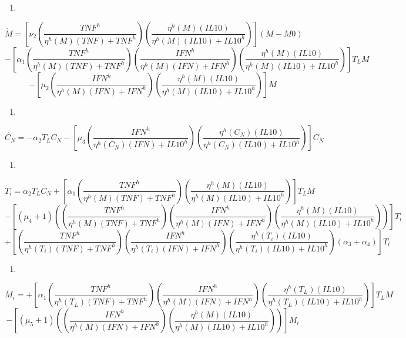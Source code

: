\documentclass[
]{article}
\providecommand{\tightlist}{%
  \setlength{\itemsep}{0pt}\setlength{\parskip}{0pt}}
\begin{document}
\begin{enumerate}
\def\labelenumi{\arabic{enumi}.}
\setcounter{enumi}{1}
\tightlist
\item
\end{enumerate}

\[ \dot{M}= [\nu_{2}(\dfrac{TNF^{h}}{\eta^{h}(M)(TNF)+TNF^{h}})(\dfrac{\eta^{h}(M)(IL10)}{\eta^{h}(M)(IL10)+IL10^{h}})](M-M0)\]
\[-[\alpha_{1}(\dfrac{TNF^{h}}{\eta^{h}(M)(TNF)+ TNF^{h}})(\dfrac{IFN^{h}}{\eta^{h}(M)(IFN)+IFN^{h}})(\dfrac{\eta^{h}(M)(IL10)}{\eta^{h}(M)(IL10)+IL10^{h}})]T_{L}M\]
\[-[\mu_{2}(\dfrac{IFN^{h}}{\eta^{h}(M)(IFN)+IFN^{h}})(\dfrac{\eta^{h}(M)(IL10)}{\eta^{h}(M)(IL10)+IL10^{h}})]M  \]

\begin{enumerate}
\def\labelenumi{\arabic{enumi}.}
\setcounter{enumi}{2}
\tightlist
\item
\end{enumerate}

\[ \dot{C_{N}}= -\alpha_{2}T_{L}C_{N}-[\mu_{3}(\dfrac{IFN^{h}}{\eta^{h}(C_{N})(IFN)+IL10^{h}})(\dfrac{\eta^{h}(C_{N})(IL10)}{\eta^{h}(C_{N})(IL10)+IL10^{h}})]C_{N} \]

\begin{enumerate}
\def\labelenumi{\arabic{enumi}.}
\setcounter{enumi}{3}
\tightlist
\item
\end{enumerate}

\[ \dot{T_{i}}=\alpha_{2}T_{L}C_{N}+[\alpha_{1}(\dfrac{TNF^{h}}{\eta^{h}(M)(TNF)+ TNF^{h}})(\dfrac{\eta^{h}(M)(IL10)}{\eta^{h}(M)(IL10)+IL10^{h}})]T_{L}M  \]
\[-[(\mu_{4}+1)((\dfrac{TNF^{h}}{\eta^{h}(M)(TNF)+TNF^{h}})(\dfrac{IFN^{h}}{\eta^{h}(M)(IFN)+IFN^{h}})(\dfrac{\eta^{h}(M)(IL10)}{\eta^{h}(M)(IL10)+IL10^{h}}))]T_{i} \]
\[+[(\dfrac{TNF^{h}}{\eta^{h}(T_{i})(TNF)+TNF^{h}})(\dfrac{IFN^{h}}{\eta^{h}(T_{i})(IFN)+IFN^{h}})(\dfrac{\eta^{h}(T_{i})(IL10)}{\eta^{h}(T_{i})(IL10)+IL10^{h}})(\alpha_{3}+\alpha_{4})]T_{i}  \]

\begin{enumerate}
\def\labelenumi{\arabic{enumi}.}
\setcounter{enumi}{4}
\tightlist
\item
\end{enumerate}

\[ \dot{M_{i}}= +[\alpha_{1}(\dfrac{TNF^{h}}{\eta^{h}(T_{L})(TNF)+TNF^{h}})(\dfrac{IFN^{h}}{\eta^{h}(M)(IFN)+IFN^{h}})(\dfrac{\eta^{h}(T_{L})(IL10)}{\eta^{h}(T_{L})(IL10)+IL10^{h}})]T_{L}M   \]
\[-[(\mu_{5}+1)((\dfrac{IFN^{h}}{\eta^{h}(M)(IFN)+IFN^{h}})(\dfrac{\eta^{h}(M)(IL10)}{\eta^{h}(M)(IL10)+IL10^{h}}))]M_{i}  \]
\end{document}
